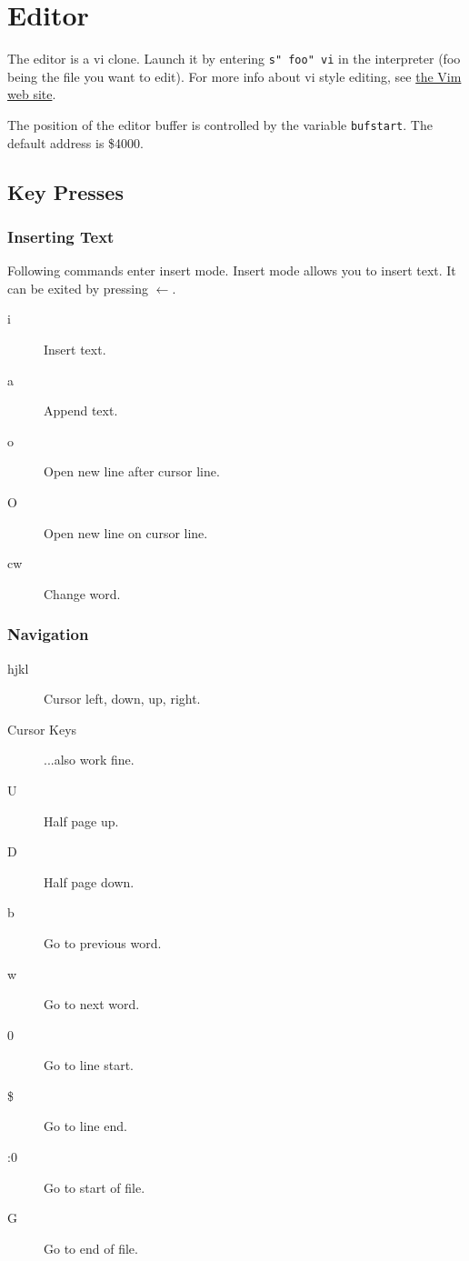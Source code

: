 \chapter{Editor} \label{editor}

The editor is a vi clone. Launch it by entering \texttt{s" foo" vi} in the interpreter (foo being the file you want to edit). For more info about vi style editing, see \href{http://www.vim.org}{the Vim web site}.

The position of the editor buffer is controlled by the variable \texttt{bufstart}. The default address is \$4000.

\section{Key Presses}

\subsection{Inserting Text}
Following commands enter insert mode. Insert mode allows you to insert text. It can be exited by pressing $\leftarrow$.
\begin{description}
\item[i] Insert text.
\item[a] Append text.
\item[o] Open new line after cursor line.
\item[O] Open new line on cursor line.
\item[cw] Change word.
\end{description}

\subsection{Navigation}
\begin{description}
\item[hjkl] Cursor left, down, up, right.
\item[Cursor Keys] ...also work fine.
\item[U] Half page up.
\item[D] Half page down.
\item[b] Go to previous word.
\item[w] Go to next word.
\item[0] Go to line start.
\item[\$] Go to line end.
\item[:0] Go to start of file.
\item[G] Go to end of file.
\end{description}

